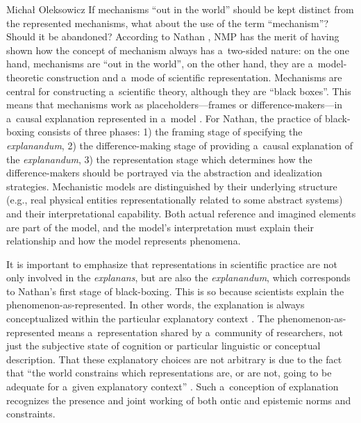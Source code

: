 \begin{artengenv}{Michał Oleksowicz}
If mechanisms ``out in the world'' should be kept distinct from the represented mechanisms, what about the use of the term ``mechanism''? Should it be abandoned? According to Nathan
\parencite*[][pp.162–190]{nathan_black_2021}, %
 NMP has the merit of having shown how the concept of mechanism always has a~two-sided nature: on the one hand, mechanisms are ``out in the world'', on the other hand, they are a~model-theoretic construction and a~mode of scientific representation. Mechanisms are central for constructing a~scientific theory, although they are ``black boxes''. This means that mechanisms work as placeholders---frames or difference-makers---in a~causal explanation represented in a~model 
\parencite[][p.133]{nathan_black_2021}. %
 For Nathan, the practice of black-boxing consists of three phases: 1) the framing stage of specifying the \textit{explanandum}, 2) the difference-making stage of providing a~causal explanation of the \textit{explanandum}, 3) the representation stage which determines how the difference-makers should be portrayed via the abstraction and idealization strategies. Mechanistic models are distinguished by their underlying structure (e.g., real physical entities representationally related to some abstract systems) and their interpretational capability. Both actual reference and imagined elements are part of the model, and the model's interpretation must explain their relationship and how the model represents phenomena.

It is important to emphasize that representations in scientific practice are not only involved in the \textit{explanans}, but are also the \textit{explanandum}, which corresponds to Nathan's first stage of black-boxing. This is so because scientists explain the phenomenon-as-represented. In other words, the explanation is always conceptualized within the particular explanatory context
\parencite[][]{bokulich_how_2011}. %
 The phenomenon-as-represented means a~representation shared by a~community of researchers, not just the subjective state of cognition or particular linguistic or conceptual description. That these explanatory choices are not arbitrary is due to the fact that ``the world constrains which representations are, or are not, going to be adequate for a~given explanatory context'' 
\parencite[][p.802]{bokulich_representing_2018}. %
 Such a~conception of explanation recognizes the presence and joint working of both ontic and epistemic norms and constraints.


\end{artengenv}
